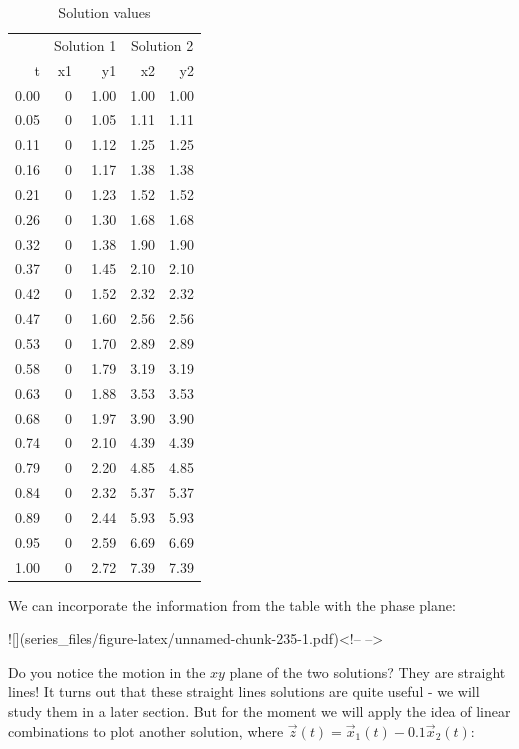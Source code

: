 \documentclass[
]{book}
\theoremstyle{definition}
\theoremstyle{definition}
\theoremstyle{definition}
\theoremstyle{remark}
\begin{document}
\begin{table}

\caption{\label{tab:unnamed-chunk-234}Solution values}
\centering
\begin{tabular}[t]{r|r|r|r|r}
\hline
\multicolumn{1}{c|}{ } & \multicolumn{2}{c|}{Solution 1} & \multicolumn{2}{c}{Solution 2} \\
\cline{2-3} \cline{4-5}
t & x1 & y1 & x2 & y2\\
\hline
0.00 & 0 & 1.00 & 1.00 & 1.00\\
\hline
0.05 & 0 & 1.05 & 1.11 & 1.11\\
\hline
0.11 & 0 & 1.12 & 1.25 & 1.25\\
\hline
0.16 & 0 & 1.17 & 1.38 & 1.38\\
\hline
0.21 & 0 & 1.23 & 1.52 & 1.52\\
\hline
0.26 & 0 & 1.30 & 1.68 & 1.68\\
\hline
0.32 & 0 & 1.38 & 1.90 & 1.90\\
\hline
0.37 & 0 & 1.45 & 2.10 & 2.10\\
\hline
0.42 & 0 & 1.52 & 2.32 & 2.32\\
\hline
0.47 & 0 & 1.60 & 2.56 & 2.56\\
\hline
0.53 & 0 & 1.70 & 2.89 & 2.89\\
\hline
0.58 & 0 & 1.79 & 3.19 & 3.19\\
\hline
0.63 & 0 & 1.88 & 3.53 & 3.53\\
\hline
0.68 & 0 & 1.97 & 3.90 & 3.90\\
\hline
0.74 & 0 & 2.10 & 4.39 & 4.39\\
\hline
0.79 & 0 & 2.20 & 4.85 & 4.85\\
\hline
0.84 & 0 & 2.32 & 5.37 & 5.37\\
\hline
0.89 & 0 & 2.44 & 5.93 & 5.93\\
\hline
0.95 & 0 & 2.59 & 6.69 & 6.69\\
\hline
1.00 & 0 & 2.72 & 7.39 & 7.39\\
\hline
\end{tabular}
\end{table}
We can incorporate the information from the table with the phase plane:

![](series_files/figure-latex/unnamed-chunk-235-1.pdf)<!-- --> 

Do you notice the motion in the $xy$ plane of the two solutions?  They are straight lines!  It turns out that these straight lines solutions are quite useful - we will study them in a later section.  But for the moment we will apply the idea of linear combinations to plot another solution, where $\vec{z}(t)=\vec{x}_{1}(t) -0.1 \vec{x}_{2}(t)$:
\end{document}
